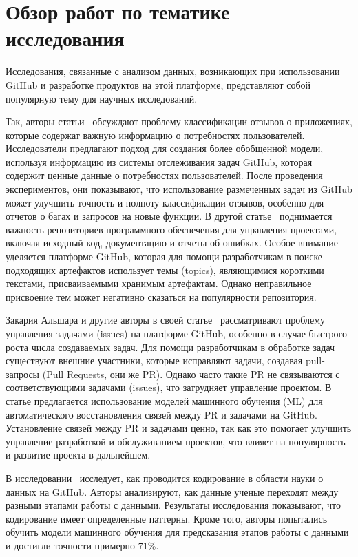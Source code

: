 \newpage
\section{Обзор работ по тематике исследования}
\label{subsec:Rewiev}
Исследования, связанные с анализом данных, возникающих при использовании GitHub и разработке продуктов на этой платформе, представляют собой популярную тему для научных исследований.

Так, авторы статьи~\cite{abs-2308-14211} обсуждают проблему классификации отзывов о приложениях, которые содержат важную информацию о потребностях пользователей. Исследователи предлагают подход для создания более обобщенной модели, используя информацию из системы отслеживания задач GitHub, которая содержит ценные данные о потребностях пользователей. После проведения экспериментов, они показывают, что использование размеченных задач из GitHub может улучшить точность и полноту классификации отзывов, особенно для отчетов о багах и запросов на новые функции. В другой статье~\cite{RoccoRSNR23} поднимается важность репозиториев программного обеспечения для управления проектами, включая исходный код, документацию и отчеты об ошибках. Особое внимание уделяется платформе GitHub, которая для помощи разработчикам в поиске подходящих артефактов использует темы (topics), являющимися короткими текстами, присваиваемыми хранимым артефактам. Однако неправильное присвоение тем может негативно сказаться на популярности репозитория. 

Закария Альшара и другие авторы в своей статье~\cite{AlsharaSSS23} рассматривают проблему управления задачами (issues) на платформе GitHub, особенно в случае быстрого роста числа создаваемых задач. Для помощи разработчикам в обработке задач существуют внешние участники, которые исправляют задачи, создавая pull-запросы (Pull Requests, они же PR). Однако часто такие PR не связываются с соответствующими задачами (issues), что затрудняет управление проектом. В статье предлагается использование моделей машинного обучения (ML) для автоматического восстановления связей между PR и задачами на GitHub. Установление связей между PR и задачами ценно, так как это помогает улучшить управление разработкой и обслуживанием проектов, что влияет на популярность и развитие проекта в дальнейшем.

В исследовании~\cite{RamasamySBB23} исследует, как проводится кодирование в области науки о данных на GitHub. Авторы анализируют, как данные ученые переходят между разными этапами работы с данными. Результаты исследования показывают, что кодирование имеет определенные паттерны. Кроме того, авторы попытались обучить модели машинного обучения для предсказания этапов работы с данными и достигли точности примерно 71\%.

